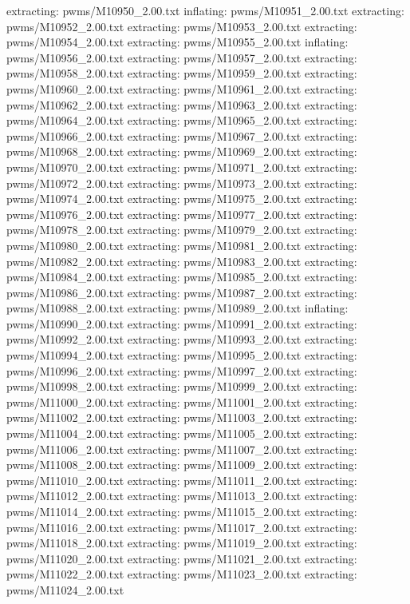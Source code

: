 \documentclass[letterpaper,10pt,english]{sphinxmanual}
\begin{document}
{\begin{sphinxVerbatim}[commandchars=\\\{\}]
 extracting: pwms/M10950\_2.00.txt
  inflating: pwms/M10951\_2.00.txt
 extracting: pwms/M10952\_2.00.txt
 extracting: pwms/M10953\_2.00.txt
 extracting: pwms/M10954\_2.00.txt
 extracting: pwms/M10955\_2.00.txt
  inflating: pwms/M10956\_2.00.txt
 extracting: pwms/M10957\_2.00.txt
 extracting: pwms/M10958\_2.00.txt
 extracting: pwms/M10959\_2.00.txt
 extracting: pwms/M10960\_2.00.txt
 extracting: pwms/M10961\_2.00.txt
 extracting: pwms/M10962\_2.00.txt
 extracting: pwms/M10963\_2.00.txt
 extracting: pwms/M10964\_2.00.txt
 extracting: pwms/M10965\_2.00.txt
 extracting: pwms/M10966\_2.00.txt
 extracting: pwms/M10967\_2.00.txt
 extracting: pwms/M10968\_2.00.txt
 extracting: pwms/M10969\_2.00.txt
 extracting: pwms/M10970\_2.00.txt
 extracting: pwms/M10971\_2.00.txt
 extracting: pwms/M10972\_2.00.txt
 extracting: pwms/M10973\_2.00.txt
 extracting: pwms/M10974\_2.00.txt
 extracting: pwms/M10975\_2.00.txt
 extracting: pwms/M10976\_2.00.txt
 extracting: pwms/M10977\_2.00.txt
 extracting: pwms/M10978\_2.00.txt
 extracting: pwms/M10979\_2.00.txt
 extracting: pwms/M10980\_2.00.txt
 extracting: pwms/M10981\_2.00.txt
 extracting: pwms/M10982\_2.00.txt
 extracting: pwms/M10983\_2.00.txt
 extracting: pwms/M10984\_2.00.txt
 extracting: pwms/M10985\_2.00.txt
 extracting: pwms/M10986\_2.00.txt
 extracting: pwms/M10987\_2.00.txt
 extracting: pwms/M10988\_2.00.txt
 extracting: pwms/M10989\_2.00.txt
  inflating: pwms/M10990\_2.00.txt
 extracting: pwms/M10991\_2.00.txt
 extracting: pwms/M10992\_2.00.txt
 extracting: pwms/M10993\_2.00.txt
 extracting: pwms/M10994\_2.00.txt
 extracting: pwms/M10995\_2.00.txt
 extracting: pwms/M10996\_2.00.txt
 extracting: pwms/M10997\_2.00.txt
 extracting: pwms/M10998\_2.00.txt
 extracting: pwms/M10999\_2.00.txt
 extracting: pwms/M11000\_2.00.txt
 extracting: pwms/M11001\_2.00.txt
 extracting: pwms/M11002\_2.00.txt
 extracting: pwms/M11003\_2.00.txt
 extracting: pwms/M11004\_2.00.txt
 extracting: pwms/M11005\_2.00.txt
 extracting: pwms/M11006\_2.00.txt
 extracting: pwms/M11007\_2.00.txt
 extracting: pwms/M11008\_2.00.txt
 extracting: pwms/M11009\_2.00.txt
 extracting: pwms/M11010\_2.00.txt
 extracting: pwms/M11011\_2.00.txt
 extracting: pwms/M11012\_2.00.txt
 extracting: pwms/M11013\_2.00.txt
 extracting: pwms/M11014\_2.00.txt
 extracting: pwms/M11015\_2.00.txt
 extracting: pwms/M11016\_2.00.txt
 extracting: pwms/M11017\_2.00.txt
 extracting: pwms/M11018\_2.00.txt
 extracting: pwms/M11019\_2.00.txt
 extracting: pwms/M11020\_2.00.txt
 extracting: pwms/M11021\_2.00.txt
 extracting: pwms/M11022\_2.00.txt
 extracting: pwms/M11023\_2.00.txt
 extracting: pwms/M11024\_2.00.txt

\end{sphinxVerbatim}}
\end{document}
